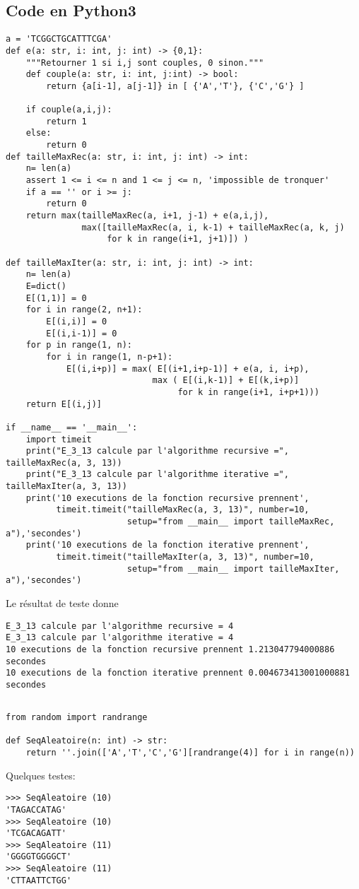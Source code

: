 \documentclass[french]{article}
\begin{document}
\subsection{Code en Python3}
\begin{lstlisting}
a = 'TCGGCTGCATTTCGA'
def e(a: str, i: int, j: int) -> {0,1}:
    """Retourner 1 si i,j sont couples, 0 sinon."""
    def couple(a: str, i: int, j:int) -> bool:
        return {a[i-1], a[j-1]} in [ {'A','T'}, {'C','G'} ]

    if couple(a,i,j):
        return 1
    else:
        return 0
def tailleMaxRec(a: str, i: int, j: int) -> int:
    n= len(a)
    assert 1 <= i <= n and 1 <= j <= n, 'impossible de tronquer'
    if a == '' or i >= j:
        return 0
    return max(tailleMaxRec(a, i+1, j-1) + e(a,i,j),
               max([tailleMaxRec(a, i, k-1) + tailleMaxRec(a, k, j)
                    for k in range(i+1, j+1)]) )

def tailleMaxIter(a: str, i: int, j: int) -> int:
    n= len(a)
    E=dict()
    E[(1,1)] = 0
    for i in range(2, n+1):
        E[(i,i)] = 0
        E[(i,i-1)] = 0
    for p in range(1, n):
        for i in range(1, n-p+1):
            E[(i,i+p)] = max( E[(i+1,i+p-1)] + e(a, i, i+p),
                             max ( E[(i,k-1)] + E[(k,i+p)]
                                  for k in range(i+1, i+p+1)))
    return E[(i,j)]

if __name__ == '__main__':
    import timeit
    print("E_3_13 calcule par l'algorithme recursive =", tailleMaxRec(a, 3, 13))
    print("E_3_13 calcule par l'algorithme iterative =", tailleMaxIter(a, 3, 13))
    print('10 executions de la fonction recursive prennent',
          timeit.timeit("tailleMaxRec(a, 3, 13)", number=10,
                        setup="from __main__ import tailleMaxRec, a"),'secondes')
    print('10 executions de la fonction iterative prennent',
          timeit.timeit("tailleMaxIter(a, 3, 13)", number=10,
                        setup="from __main__ import tailleMaxIter, a"),'secondes')

\end{lstlisting}
Le résultat de teste donne
\begin{lstlisting}
E_3_13 calcule par l'algorithme recursive = 4
E_3_13 calcule par l'algorithme iterative = 4
10 executions de la fonction recursive prennent 1.213047794000886 secondes
10 executions de la fonction iterative prennent 0.004673413001000881 secondes
\end{lstlisting}

\subsection{}
\begin{lstlisting}
from random import randrange 

def SeqAleatoire(n: int) -> str:
    return ''.join(['A','T','C','G'][randrange(4)] for i in range(n))
\end{lstlisting}
Quelques testes:
\begin{lstlisting}
>>> SeqAleatoire (10)
'TAGACCATAG'
>>> SeqAleatoire (10)
'TCGACAGATT'
>>> SeqAleatoire (11)
'GGGGTGGGGCT'
>>> SeqAleatoire (11)
'CTTAATTCTGG'
\end{lstlisting}
\end{document}
